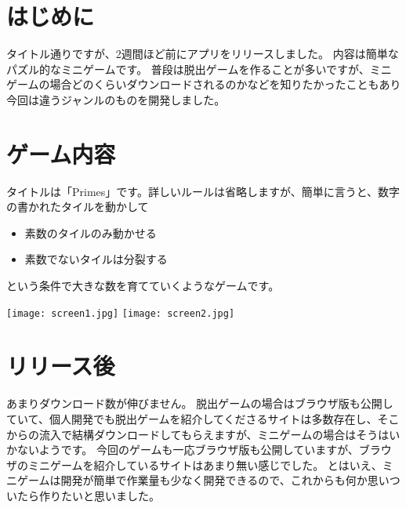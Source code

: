 ﻿%




\section{はじめに}
タイトル通りですが、2週間ほど前にアプリをリリースしました。
内容は簡単なパズル的なミニゲームです。
普段は脱出ゲームを作ることが多いですが、ミニゲームの場合どのくらいダウンロードされるのかなどを知りたかったこともあり今回は違うジャンルのものを開発しました。

\section{ゲーム内容}
タイトルは「Primes」です。詳しいルールは省略しますが、簡単に言うと、数字の書かれたタイルを動かして
\begin{itemize}
	\item 素数のタイルのみ動かせる
	\item 素数でないタイルは分裂する
\end{itemize}
という条件で大きな数を育てていくようなゲームです。
\begin{center}
	\texttt{[image: screen1.jpg]}
	\texttt{[image: screen2.jpg]}
\end{center}
\section{リリース後}
あまりダウンロード数が伸びません。
脱出ゲームの場合はブラウザ版も公開していて、個人開発でも脱出ゲームを紹介してくださるサイトは多数存在し、そこからの流入で結構ダウンロードしてもらえますが、ミニゲームの場合はそうはいかないようです。
今回のゲームも一応ブラウザ版も公開していますが、ブラウザのミニゲームを紹介しているサイトはあまり無い感じでした。
とはいえ、ミニゲームは開発が簡単で作業量も少なく開発できるので、これからも何か思いついたら作りたいと思いました。

